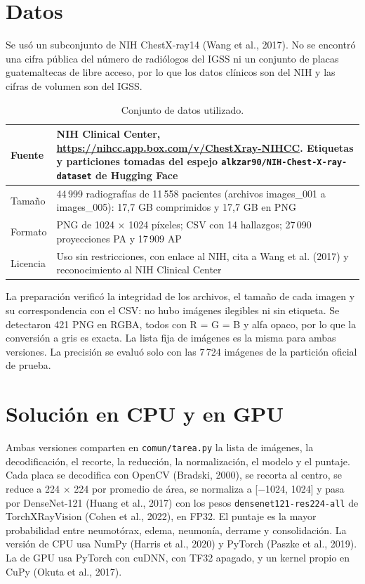 \documentclass[11pt,letterpaper]{article}
\begin{document}
\section{Datos}

Se usó un subconjunto de NIH ChestX-ray14 (Wang et al., 2017). No se encontró una cifra pública del número de radiólogos del IGSS ni un conjunto de placas guatemaltecas de libre acceso, por lo que los datos clínicos son del NIH y las cifras de volumen son del IGSS.

\begin{table}[h]
\centering
\caption{Conjunto de datos utilizado.}
\begin{tabularx}{\linewidth}{|l|X|}
\hline
Fuente & NIH Clinical Center, \url{https://nihcc.app.box.com/v/ChestXray-NIHCC}. Etiquetas y particiones tomadas del espejo \texttt{alkzar90/NIH-Chest-X-ray-dataset} de Hugging Face \\ \hline
Tamaño & 44\,999 radiografías de 11\,558 pacientes (archivos images\_001 a images\_005): 17,7 GB comprimidos y 17,7 GB en PNG \\ \hline
Formato & PNG de 1024 × 1024 píxeles; CSV con 14 hallazgos; 27\,090 proyecciones PA y 17\,909 AP \\ \hline
Licencia & Uso sin restricciones, con enlace al NIH, cita a Wang et al. (2017) y reconocimiento al NIH Clinical Center \\ \hline
\end{tabularx}
\end{table}

La preparación verificó la integridad de los archivos, el tamaño de cada imagen y su correspondencia con el CSV: no hubo imágenes ilegibles ni sin etiqueta. Se detectaron 421 PNG en RGBA, todos con R = G = B y alfa opaco, por lo que la conversión a gris es exacta. La lista fija de imágenes es la misma para ambas versiones. La precisión se evaluó solo con las 7\,724 imágenes de la partición oficial de prueba.

\section{Solución en CPU y en GPU}

Ambas versiones comparten en \texttt{comun/tarea.py} la lista de imágenes, la decodificación, el recorte, la reducción, la normalización, el modelo y el puntaje. Cada placa se decodifica con OpenCV (Bradski, 2000), se recorta al centro, se reduce a 224 × 224 por promedio de área, se normaliza a [−1024, 1024] y pasa por DenseNet-121 (Huang et al., 2017) con los pesos \texttt{densenet121-res224-all} de TorchXRayVision (Cohen et al., 2022), en FP32. El puntaje es la mayor probabilidad entre neumotórax, edema, neumonía, derrame y consolidación. La versión de CPU usa NumPy (Harris et al., 2020) y PyTorch (Paszke et al., 2019). La de GPU usa PyTorch con cuDNN, con TF32 apagado, y un kernel propio en CuPy (Okuta et al., 2017).
\end{document}
